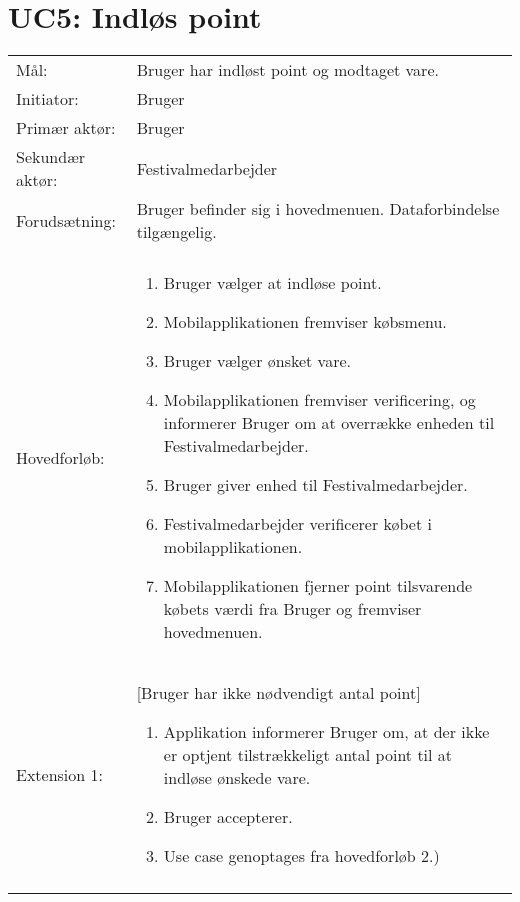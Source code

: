 \section{UC5: Indløs point}
\begin{tabular}{ >{\raggedleft} p{3cm} | p{12cm} }
Mål: & Bruger har indløst point og modtaget vare. \\
Initiator: & Bruger \\
Primær aktør: & Bruger \\
Sekundær aktør: & Festivalmedarbejder  \\
Forudsætning: & Bruger befinder sig i hovedmenuen. \newline
Dataforbindelse tilgængelig.
 \\
 & \\
Hovedforløb:  & \begin{enumerate}[label=\arabic*.),itemjoin={\newline},topsep=0pt,partopsep=0pt,itemsep=0pt,leftmargin=*]   
\item Bruger vælger at indløse point.
\item Mobilapplikationen fremviser købsmenu.
\item Bruger vælger ønsket vare.   
\item Mobilapplikationen fremviser verificering, og informerer Bruger om at overrække enheden til Festivalmedarbejder.
\item Bruger giver enhed til Festivalmedarbejder.
\item Festivalmedarbejder verificerer købet i mobilapplikationen.
\item Mobilapplikationen fjerner point tilsvarende købets værdi fra Bruger og 
fremviser hovedmenuen.

\end{enumerate}\\
Extension 1: & [Bruger har ikke nødvendigt antal point]
\vspace{2 mm}
\begin{enumerate}[label=\arabic*.),itemjoin={\newline},topsep=0pt,partopsep=0pt,itemsep=0pt,leftmargin=*]   
\item Applikation informerer Bruger om, at der ikke er optjent tilstrækkeligt antal point til at indløse ønskede vare.
\item Bruger accepterer.
\item Use case genoptages fra hovedforløb 2.)
\end{enumerate} \\
& \\
\end{tabular}

